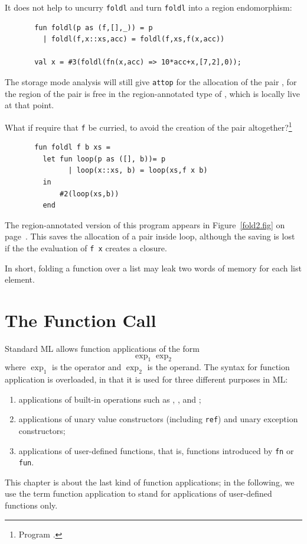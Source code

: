 \documentclass[12pt]{book}
\begin{document}
It does not help to uncurry {\tt foldl} and turn {\tt foldl} into a region endomorphism: 
\begin{verbatim}
       fun foldl(p as (f,[],_)) = p
         | foldl(f,x::xs,acc) = foldl(f,xs,f(x,acc))

       val x = #3(foldl(fn(x,acc) => 10*acc+x,[7,2],0));
\end{verbatim}
The storage mode analysis will still give {\tt attop} for
the allocation of the pair , for
the region of the pair is free in the region-annotated type of ,
which is locally live at that point.

What if require that {\tt f} be curried, to avoid the creation of the pair 
altogether?\footnote{Program .}
\begin{verbatim}
       fun foldl f b xs = 
         let fun loop(p as ([], b))= p
               | loop(x::xs, b) = loop(xs,f x b)
         in
             #2(loop(xs,b))
         end
\end{verbatim}
The region-annotated version of this program appears in Figure~\ref{fold2.fig} 
on page~\pageref{fold2.fig}. This saves the allocation of a pair inside loop,
although the saving is  lost if the the evaluation of {\tt f x} creates a closure.

In short, folding a function over a list may leak two words of memory for each
list element. 
\chapter{The Function Call}
Standard ML allows function applications of the form
$$\exp_1 \exp_2$$
where $\exp_1$ is the operator and $\exp_2$ is the operand.
The syntax for  function application is overloaded, in that it is used
for  three different purposes in ML:
\begin{enumerate}
\item applications of built-in operations such as \boxml{+}, \boxml{=}, and \boxml{:=};
\item applications of unary value constructors (including {\tt ref}) and unary exception constructors;
\item applications of user-defined functions, that is, functions introduced by {\tt fn} or {\tt fun}.
\end{enumerate}
This chapter is about the last kind of function applications; in the following,
we use the term function application to stand for applications of user-defined functions
only.
\end{document}
